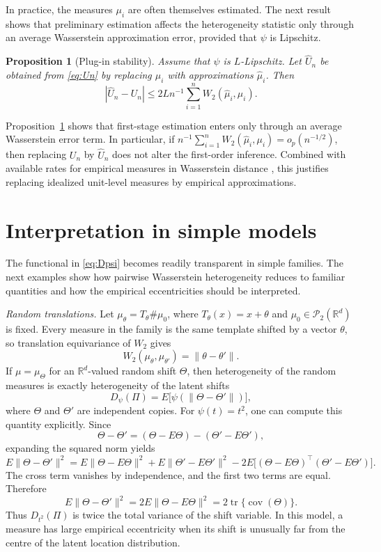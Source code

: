 \documentclass[10pt]{article}
\newtheorem{proposition}[theorem]{Proposition}
\DeclareMathOperator{\covop}{cov}
\newcommand{\R}{\mathbb{R}}
\DeclareMathOperator{\tr}{tr}
\newcommand{\Ptwo}{\mathcal{P}_2(\R^d)}
\newcommand{\W}{W_2}
\begin{document}
In practice, the measures $\mu_i$ are often themselves estimated. The next result shows that preliminary estimation affects the heterogeneity statistic only through an average Wasserstein approximation error, provided that $\psi$ is Lipschitz.

\begin{proposition}[Plug-in stability]\label{prop:plugin}
Assume that $\psi$ is $L$-Lipschitz. Let $\widehat U_n$ be obtained from \eqref{eq:Un} by replacing $\mu_i$ with approximations $\widehat\mu_i$. Then
\[
|\widehat U_n-U_n|\leq 2Ln^{-1}\sum_{i=1}^n \W(\widehat\mu_i,\mu_i).
\]
\end{proposition}

Proposition~\ref{prop:plugin} shows that first-stage estimation enters only through an average Wasserstein error term. In particular, if $n^{-1}\sum_{i=1}^n \W(\widehat\mu_i,\mu_i)=o_p(n^{-1/2})$, then replacing $U_n$ by $\widehat U_n$ does not alter the first-order inference. Combined with available rates for empirical measures in Wasserstein distance \citep{fournier_2015_RateConvergenceWasserstein}, this justifies replacing idealized unit-level measures by empirical approximations.

\section{Interpretation in simple models}

The functional in \eqref{eq:Dpsi} becomes readily transparent in simple families. The next examples show how pairwise Wasserstein heterogeneity reduces to familiar quantities and how the empirical eccentricities should be interpreted.

\smallskip\noindent\textit{Random translations.}
Let $\mu_{\theta}=T_{\theta}\#\mu_0$, where $T_{\theta}(x)=x+\theta$ and $\mu_0\in\Ptwo$ is fixed. Every measure in the family is the same template shifted by a vector $\theta$, so translation equivariance of $\W$ gives
\[
\W(\mu_{\theta},\mu_{\theta'})=\|\theta-\theta'\|.
\]
If $\mu=\mu_{\Theta}$ for an $\R^d$-valued random shift $\Theta$, then heterogeneity of the random measures is exactly heterogeneity of the latent shifts
\[
D_{\psi}(\Pi)=E\bigl[\psi(\|\Theta-\Theta'\|)\bigr],
\]
where $\Theta$ and $\Theta'$ are independent copies. For $\psi(t)=t^2$, one can compute this quantity explicitly. Since
\[
\Theta-\Theta'=(\Theta-E\Theta)-(\Theta'-E\Theta'),
\]
expanding the squared norm yields
\[
E\|\Theta-\Theta'\|^2=E\|\Theta-E\Theta\|^2+E\|\Theta'-E\Theta'\|^2-2E\bigl[(\Theta-E\Theta)^\top (\Theta'-E\Theta')\bigr].
\]
The cross term vanishes by independence, and the first two terms are equal. Therefore
\[
E\|\Theta-\Theta'\|^2=2E\|\Theta-E\Theta\|^2=2\tr\{\covop(\Theta)\}.
\]
Thus $D_{t^2}(\Pi)$ is twice the total variance of the shift variable. In this model, a measure has large empirical eccentricity when its shift is unusually far from the centre of the latent location distribution.
\end{document}
